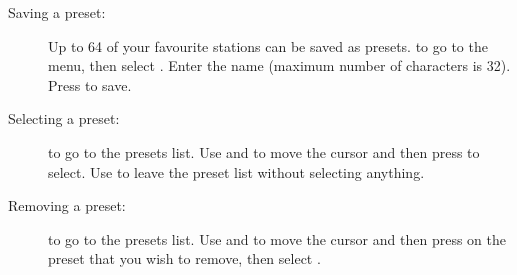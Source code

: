   \begin{description}

  \item[Saving a preset:]
    Up to 64 of your favourite stations can be saved as presets.
      \ActionFMMenu{} to go to the menu, then select .%
    Enter the name (maximum number of characters is 32).
    Press \ActionKbdDone{} to save.

  \item[Selecting a preset:]
        \ActionFMPreset{} to go to the presets list.
        Use \ActionFMSettingsInc{} and \ActionFMSettingsDec{}
        to move the cursor and then press \ActionStdOk{}
        to select. Use \ActionStdCancel{} to leave the preset list without selecting
        anything.

  \item[Removing a preset:]
        \ActionFMPreset{} to go to the presets list.
        Use \ActionFMSettingsInc{} and \ActionFMSettingsDec{}
        to move the cursor and then press \ActionStdContext{}
        on the preset that you wish to remove, then select .
  \end{description}
